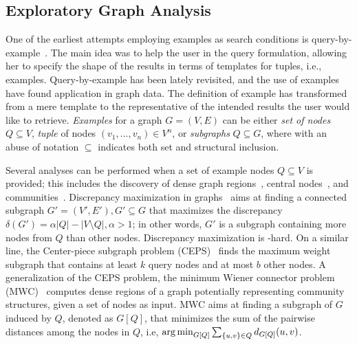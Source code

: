 \subsection{Exploratory Graph Analysis} 


\noindent One of the earliest attempts employing examples as search conditions is query-by-example~\citep{zloof1975query}.
The main idea was to help the user in the query formulation, allowing her to specify the shape of the results in terms of templates for tuples, i.e., examples.
Query-by-example has been lately revisited, and the use of examples have found application in graph data. 
The definition of example has transformed from a mere template to the representative of the intended results the user would like to retrieve.
\emph{Examples} for a graph $G = (V,E)$ can be either \emph{set of nodes} $Q \subseteq V$, \emph{tuple} of nodes $(v_1, ..., v_n) \in V^n$, or \emph{subgraphs} $Q \subseteq G$, where with an abuse of notation $\subseteq$ indicates both set and structural inclusion. 

 Several analyses can be performed when a set of example nodes $Q\subseteq V$ is provided; this includes the discovery of dense graph regions~\citep{gionis2015bump,ruchansky2015minimum}, central nodes~\citep{tong2006center}, and communities~\citep{staudt2014detecting,perozzi2014focused}.%
Discrepancy maximization in graphs~\citep{gionis2015bump} aims at finding a connected subgraph $G' = (V', E'), G' \subseteq G$ that maximizes the discrepancy $\delta(G'){=}\alpha|Q|{-}|V{\setminus}Q|, \alpha > 1$; in other words, $G'$ is a subgraph containing more nodes from $Q$ than other nodes. 
Discrepancy maximization is \NP-hard. 
On a similar line, the Center-piece subgraph problem (CEPS)~\citep{tong2006center} finds the maximum weight subgraph that contains at least $k$ query nodes and at most $b$ other nodes. 
A generalization of the CEPS problem, the minimum Wiener connector problem (MWC)~\citep{ruchansky2015minimum} computes dense regions of a graph potentially representing community structures, given a set of nodes as input. MWC aims at finding a subgraph of $G$ induced by $Q$, denoted as $G[Q]$, that minimizes the sum of the pairwise distances among the nodes in $Q$, i.e, $\operatorname*{\arg\min}_{G[Q]}\sum_{\{u,v\}{\in}Q}{}d_{G[Q]}(u,v)$. 

